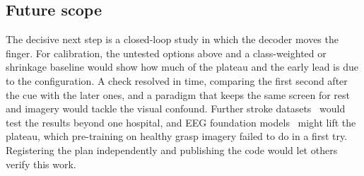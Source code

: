 \subsection{Future scope}
The decisive next step is a closed-loop study in which the decoder moves the finger. For
calibration, the untested options above and a class-weighted or shrinkage baseline would show how
much of the plateau and the early lead is due to the configuration. A check resolved in time,
comparing the first second after the cue with the later ones, and a paradigm that keeps the same
screen for rest and imagery would tackle the visual confound. Further stroke
datasets~\cite{liu2024acute,lu2026chronic} would test the results beyond one hospital, and EEG
foundation models~\cite{jiang2024labram,wang2025cbramod} might lift the plateau, which
pre-training on healthy grasp imagery failed to do in a first try. Registering the plan
independently and publishing the code would let others verify this work.
